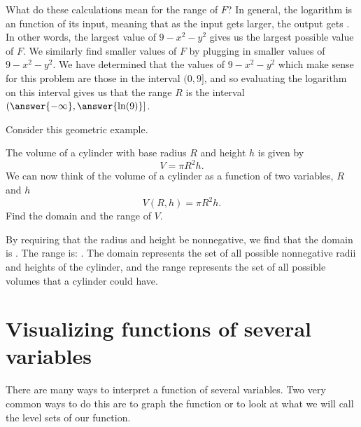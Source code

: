 \documentclass{ximera}
\begin{document}
\begin{question}
\begin{question}
\begin{question}
\begin{prompt}
        What do these calculations mean for the range of $F$?  In general, the 
        logarithm is an  
        function of its input, meaning that as the input gets larger, the output  
        gets .  In other words, 
        the largest value of $9-x^2-y^2$ gives us the largest possible value of $F$. 
        We similarly find smaller values of $F$ by plugging in smaller values of 
        $9-x^2-y^2$.  We have determined that the values of $9-x^2-y^2$ which 
        make sense for this problem are those in the interval $(0, 9]$, and so 
        evaluating the logarithm on this interval gives us that the 
        range $R$ is the interval $(\answer{-\infty},\answer{\ln(9)}]$.
      \end{prompt}
    \end{question}
  \end{question}
\end{question}

Consider this geometric example.
\begin{example}
  The volume of a cylinder with base radius $R$ and height $h$ is
  given by
  \[
  V=\pi R^2h.
  \]
  We can now think of the volume of a cylinder as a function of two
  variables, $R$ and $h$
  \[
  V(R,h) = \pi R^2h.
  \]
  Find the domain and the range of $V$.
  \begin{explanation}
    By requiring that the radius and height be nonnegative, we find that the domain is
    \wordChoice{
      \choice{$\R$}
      \choice{$[0,\infty)$}
      \choice[correct]{Points $(R,h)$ in $\R^2$ where $R \geq 0$ and $h \geq 0$, or in set notation $\{ (R,h) \in \R^2 : R \geq 0, h \geq 0\}$}
      }. 
The range is:
\wordChoice{
  \choice{$\R$}
  \choice[correct]{$[0,\infty)$}
  \choice{$\{ (R,h) \in \R^2 : R \geq 0, h \geq 0\}$}
  }.
The domain represents the set of all possible nonnegative radii and heights of the cylinder, and the range represents the set of all possible volumes that a cylinder could have.
  \end{explanation}
\end{example}



\section{Visualizing functions of several variables}

There are many ways to interpret a function of several variables.  Two
very common ways to do this are to graph the function or to look at
what we will call the level sets of our function.
\end{document}
